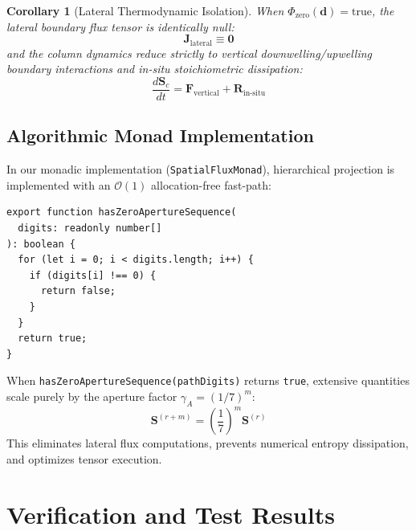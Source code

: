 \documentclass[10pt,journal,compsoc]{IEEEtran}
\newtheorem{corollary}{Corollary}
\begin{document}
\begin{corollary}[Lateral Thermodynamic Isolation]
When $\Phi_{\text{zero}}(\mathbf{d}) = \text{true}$, the lateral boundary flux tensor is identically null:
\begin{equation}
\mathbf{J}_{\text{lateral}} \equiv \mathbf{0}
\end{equation}
and the column dynamics reduce strictly to vertical downwelling/upwelling boundary interactions and in-situ stoichiometric dissipation:
\begin{equation}
\frac{d\mathbf{S}_c}{dt} = \mathbf{F}_{\text{vertical}} + \mathbf{R}_{\text{in-situ}}
\end{equation}
\end{corollary}

\subsection{Algorithmic Monad Implementation}
In our monadic implementation (\texttt{SpatialFluxMonad}), hierarchical projection is implemented with an $\mathcal{O}(1)$ allocation-free fast-path:

\begin{lstlisting}
export function hasZeroApertureSequence(
  digits: readonly number[]
): boolean {
  for (let i = 0; i < digits.length; i++) {
    if (digits[i] !== 0) {
      return false;
    }
  }
  return true;
}
\end{lstlisting}

When \texttt{hasZeroApertureSequence(pathDigits)} returns \texttt{true}, extensive quantities scale purely by the aperture factor $\gamma_A = (1/7)^m$:
\begin{equation}
\mathbf{S}^{(r+m)} = \left(\frac{1}{7}\right)^m \mathbf{S}^{(r)}
\end{equation}
This eliminates lateral flux computations, prevents numerical entropy dissipation, and optimizes tensor execution.

\section{Verification and Test Results}
\end{document}
